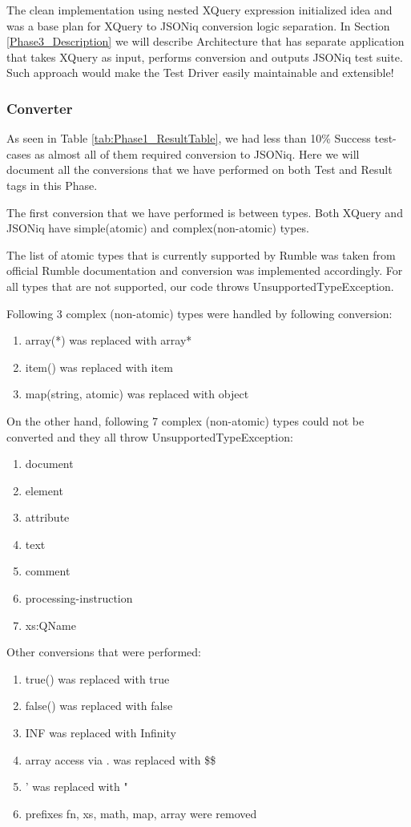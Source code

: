The clean implementation using nested XQuery expression initialized idea and was a base plan for XQuery to JSONiq conversion logic separation. In Section \ref{Phase3_Description} we will describe Architecture that has separate application that takes XQuery as input, performs conversion and outputs JSONiq test suite. Such approach would make the Test Driver easily maintainable and extensible!

\subsubsection{Converter}
\label{Phase2_Converter}
As seen in Table \ref{tab:Phase1_ResultTable}, we had less than 10\% Success test-cases as almost all of them required conversion to JSONiq. Here we will document all the conversions that we have performed on both Test and Result tags in this Phase. 

The first conversion that we have performed is between types. Both XQuery and JSONiq have simple(atomic) and complex(non-atomic) types. 

The list of atomic types that is currently supported by Rumble was taken from official Rumble documentation \cite{RumbleSupportedTypes} and conversion was implemented accordingly. For all types that are not supported, our code throws UnsupportedTypeException. 

Following 3 complex (non-atomic) types were handled by following conversion:
\begin{enumerate}
	\item array(*) was replaced with array*
	\item item() was replaced with item
	\item map(string, atomic) was replaced with object 
\end{enumerate}

On the other hand, following 7 complex (non-atomic) types could not be converted and they all throw UnsupportedTypeException:
\begin{enumerate}
	\item document
	\item element
	\item attribute
	\item text
	\item comment
	\item processing-instruction
	\item xs:QName
\end{enumerate}

Other conversions that were performed:
\begin{enumerate}
	\item true() was replaced with true
	\item false() was replaced with false
	\item INF was replaced with Infinity
	\item array access via . was replaced with \$\$
	\item ' was replaced with "
	\item prefixes fn, xs, math, map, array were removed
\end{enumerate}


